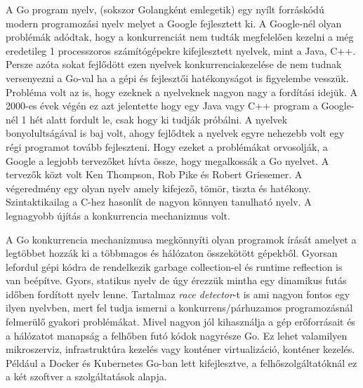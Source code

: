 


A Go program nyelv, (sokszor Golangként emlegetik) egy nyílt forráskódú modern programozási nyelv melyet a Google fejlesztett ki.
A Google-nél olyan problémák adódtak, hogy a konkurrenciát nem tudták megfelelően kezelni a még eredetileg 1 processzoros számítógépekre kifejlesztett nyelvek, mint a Java, C++.
Persze azóta sokat fejlődött ezen nyelvek konkurrenciakezelése de nem tudnak versenyezni a Go-val ha a gépi és fejlesztői hatékonyságot is figyelembe vesszük.
Probléma volt az is, hogy ezeknek a nyelveknek nagyon nagy a fordítási idejük. A 2000-es évek végén ez azt jelentette hogy egy Java vagy C++ program a Google-nél 1 hét alatt fordult le,
csak hogy ki tudják próbálni.
A nyelvek bonyolultságával is baj volt, ahogy fejlődtek a nyelvek egyre nehezebb volt egy régi programot tovább fejleszteni.
Hogy ezeket a problémákat orvosolják, a Google a legjobb tervezőket hívta össze, hogy megalkossák a Go nyelvet.
A tervezők közt volt Ken Thompson, Rob Pike és Robert Griesemer. A végeredmény egy olyan nyelv amely kifejező, tömör, tiszta és hatékony.
Szintaktikailag a C-hez hasonlít de nagyon könnyen tanulható nyelv.
A legnagyobb újítás a konkurrencia mechanizmus volt.


A Go konkurrencia mechanizmusa megkönnyíti olyan programok írását amelyet a legtöbbet hozzák ki a többmagos és hálózaton összekötött gépekből.
Gyorsan lefordul gépi kódra de rendelkezik garbage collection-el és runtime reflection is van beépítve.
Gyors, statikus nyelv de úgy érezzük mintha egy dinamikus futás időben fordított nyelv lenne.
Tartalmaz \textit{race detector}-t is ami nagyon fontos egy ilyen nyelvben, mert fel tudja ismerni a konkurrens/párhuzamos programozásnál felmerülő gyakori problémákat.
Mivel nagyon jól kihasználja a gép erőforrásait és a hálózatot manapság a felhőben futó kódok nagyrésze Go.
Ez lehet valamilyen mikroszerviz, infrastruktúra kezelés vagy konténer virtualizáció, konténer kezelés.
Például a Docker és Kubernetes Go-ban lett kifejlesztve, a felhőszolgáltatóknál ez a két szoftver a szolgáltatások alapja.

